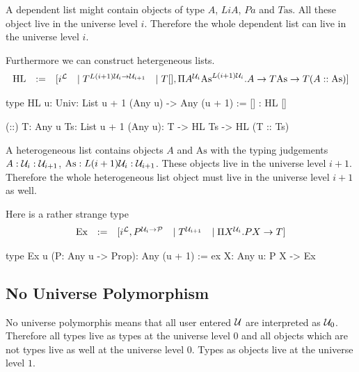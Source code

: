 A dependent list might contain objects of type $A$, $LiA$, $Pa$ and
$T\text{as}$. All these object live in the universe level $i$. Therefore the
whole dependent list can live in the universe level $i$.

Furthermore we can construct hetergeneous lists.
$$
\begin{array}{lllll}
    \text{HL} &:=&
    [
        i^{\mathcal L}
        &\mid
        T^{L(i+1){\mathcal U}_i \to {\mathcal U}_{i+1}}
        &\mid
        T[],
        \Pi A^{{\mathcal U}_i} \text{As}^{L(i+1){\mathcal U}_i}.
            A \to T\text{As} \to T(A :: \text{As})
    ]
\end{array}
$$

\begin{alba}
    type HL {u: Univ}: List {u + 1} (Any u) -> Any (u + 1) :=
        [] : HL []

        (::) {T: Any u} {Ts: List {u + 1} (Any u)}:
            T -> HL Ts -> HL (T :: Ts)
\end{alba}



A heterogeneous list contains objects $A$ and $\text{As}$ with the typing
judgements $A : {\mathcal U}_i : {\mathcal U}_{i+1}$, $\text{As}: L(i+1){\mathcal U}_i : {\mathcal U}_{i+1}$.
These objects live in the universe level $i+1$. Therefore the whole
heterogeneous list object must live in the universe level $i+1$ as well.


Here is a rather strange type
$$
\begin{array}{lllll}
    \text{Ex}
    &:=&
    [
        i^{\mathcal L},
        P^{{\mathcal U}_i \to {\mathcal P}}
        &\mid
        T^{{\mathcal U}_{i+1}}
        &\mid
        \Pi X^{{\mathcal U}_i}. P X \to T
    ]
\end{array}
$$

\begin{alba}
    type Ex {u} (P: Any u -> Prop): Any (u + 1) :=
        ex {X: Any u}: P X -> Ex
\end{alba}




\subsection{No Universe Polymorphism}

No universe polymorphis means that all user entered ${\mathcal U}$ are interpreted as
${\mathcal U}_0$. Therefore all types live as types at the universe level $0$ and all
objects which are not types live as well at the universe level $0$. Types as
objects live at the universe level $1$.

